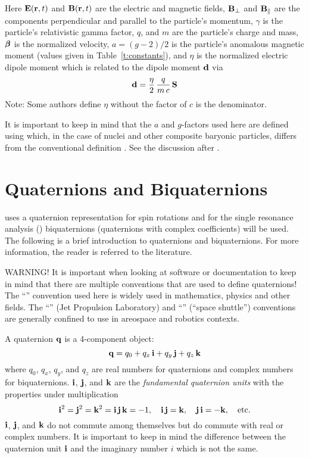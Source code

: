 Here ${\bf E} ({\bf r} ,t)$ and ${\bf B} ({\bf r} ,t)$ are the electric and magnetic fields, ${\bf B}_\perp$
and ${\bf B}_\parallel$ are the components perpendicular and parallel to the particle's momentum,
$\gamma$ is the particle's relativistic gamma factor, $q$, and $m$ are the particle's charge and
mass, $\boldsymbol{\beta}$ is the normalized velocity, $a = (g-2)/2$ is the particle's anomalous magnetic
moment (values given in Table~\ref{t:constants}), and $\eta$ is the normalized electric dipole
moment which is related to the dipole moment ${\bf d}$ via
\begin{equation}
  {\bf d} = \frac{\eta}{2} \, \frac{q}{m \, c} \, {\bf S}
\end{equation}
Note: Some authors define $\eta$ without the factor of $c$ is the denominator.

It is important to keep in mind that the $a$ and $g$-factors used here are defined using 
which, in the case of nuclei and other composite baryonic particles, differs from the conventional
definition . See the discussion after .

\section{Quaternions and Biquaternions}
\label{s:quat}

\bmad uses a quaternion representation for spin rotations\cite{b:quat} and for the single resonance
analysis () biquaternions (quaternions with complex coefficients) will be used. The
following is a brief introduction to quaternions and biquaternions. For more information, the reader is
referred to the literature\cite{b:biquat}.

WARNING! It is important when looking at software or documentation to keep in mind that there are
multiple conventions that are used to define quaternions! The ``'' convention used here
is widely used in mathematics, physics and other fields. The ``'' (Jet Propulsion
Laboratory) and ``'' (``space shuttle'') conventions are generally confined to use in
areospace and robotics contexts\cite{b:yazell,b:sommer}.

A quaternion ${\bf q}$ is a 4-component object:
\begin{equation}
  {\bf q} = q_0 + q_x \, {\bf i} + q_y \, {\bf j} + q_z \, {\bf k}
  \label{qqqqq}
\end{equation}
where $q_0$, $q_x$, $q_y$, and $q_z$ are real numbers for quaternions and complex numbers for
biquaternions. ${\bf i}$, ${\bf j}$, and ${\bf k}$ are the {\em fundamental quaternion units} with the
properties under multiplication
\begin{equation}
  {\bf i}^2 = {\bf j}^2 = {\bf k}^2 = {\bf i} \, {\bf j} \, {\bf k} = -1, \quad 
  {\bf i} \, {\bf j} = {\bf k}, \quad {\bf j} \, {\bf i} = -{\bf k}, \quad \text{etc.}
\end{equation}
${\bf i}$, ${\bf j}$, and ${\bf k}$ do not commute among themselves but do commute with real or complex
numbers. It is important to keep in mind the difference between the quaternion unit ${\bf i}$
and the imaginary number $i$ which is not the same.

